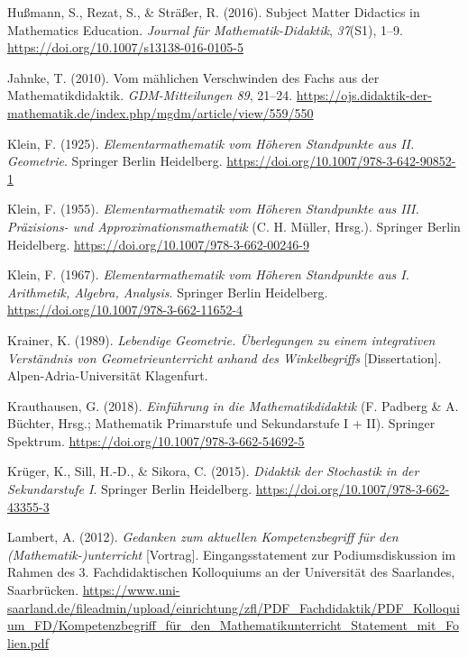 \documentclass[
]{scrbook}
\newlength{\cslhangindent}
\newenvironment{CSLReferences}[2] %
 {\begin{list}{}{%
  \setlength{\itemindent}{0pt}
  \setlength{\leftmargin}{0pt}
  \setlength{\parsep}{0pt}
  \ifodd #1
   \setlength{\leftmargin}{\cslhangindent}
   \setlength{\itemindent}{-1\cslhangindent}
  \fi
  \setlength{\itemsep}{#2\baselineskip}}}
 {\end{list}}
\theoremstyle{definition}
\theoremstyle{definition}
\theoremstyle{definition}
\theoremstyle{definition}
\theoremstyle{remark}
\begin{document}
\begin{CSLReferences}{1}{0}
Hußmann, S., Rezat, S., \& Sträßer, R. (2016). Subject {Matter} {Didactics} in {Mathematics} {Education}. \emph{Journal für Mathematik-Didaktik}, \emph{37}(S1), 1--9. \url{https://doi.org/10.1007/s13138-016-0105-5}

Jahnke, T. (2010). Vom mählichen {Verschwinden} des {Fachs} aus der {Mathematikdidaktik}. \emph{GDM-Mitteilungen 89}, 21--24. \url{https://ojs.didaktik-der-mathematik.de/index.php/mgdm/article/view/559/550}

Klein, F. (1925). \emph{Elementarmathematik vom {Höheren} {Standpunkte} aus {II}. {Geometrie}}. Springer Berlin Heidelberg. \url{https://doi.org/10.1007/978-3-642-90852-1}

Klein, F. (1955). \emph{Elementarmathematik vom {Höheren} {Standpunkte} aus {III}. {Präzisions}- und {Approximationsmathematik}} (C. H. Müller, Hrsg.). Springer Berlin Heidelberg. \url{https://doi.org/10.1007/978-3-662-00246-9}

Klein, F. (1967). \emph{Elementarmathematik vom {Höheren} {Standpunkte} aus {I}. {Arithmetik}, {Algebra}, {Analysis}}. Springer Berlin Heidelberg. \url{https://doi.org/10.1007/978-3-662-11652-4}

Krainer, K. (1989). \emph{Lebendige {Geometrie}. Überlegungen zu einem integrativen {Verständnis} von {Geometrieunterricht} anhand des {Winkelbegriffs}} {[}Dissertation{]}. Alpen-Adria-Universität Klagenfurt.

Krauthausen, G. (2018). \emph{Einführung in die {Mathematikdidaktik}} (F. Padberg \& A. Büchter, Hrsg.; Mathematik Primarstufe und Sekundarstufe I + II). Springer Spektrum. \url{https://doi.org/10.1007/978-3-662-54692-5}

Krüger, K., Sill, H.-D., \& Sikora, C. (2015). \emph{Didaktik der {Stochastik} in der {Sekundarstufe} {I}}. Springer Berlin Heidelberg. \url{https://doi.org/10.1007/978-3-662-43355-3}

Lambert, A. (2012). \emph{Gedanken zum aktuellen {Kompetenzbegriff} für den ({Mathematik}-)unterricht} {[}Vortrag{]}. Eingangsstatement zur Podiumsdiskussion im Rahmen des 3. Fachdidaktischen Kolloquiums an der Universität des Saarlandes, Saarbrücken. \url{https://www.uni-saarland.de/fileadmin/upload/einrichtung/zfl/PDF_Fachdidaktik/PDF_Kolloquium_FD/Kompetenzbegriff_für_den_Mathematikunterricht_Statement_mit_Folien.pdf}


\end{CSLReferences}
\end{document}
